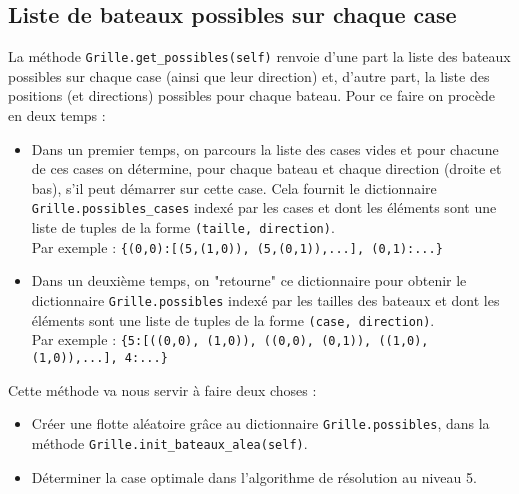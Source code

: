 \subsection{Liste de bateaux possibles sur chaque case}
La méthode \texttt{Grille.get\_possibles(self)} renvoie d'une part la liste des bateaux possibles sur chaque case (ainsi que leur direction) et, d'autre part, la liste des positions (et directions) possibles pour chaque bateau. Pour ce faire on procède en deux temps :
\begin{itemize}
\item Dans un premier temps, on parcours la liste des cases vides et pour chacune de ces cases on détermine, pour chaque bateau et chaque direction (droite et bas), s'il peut démarrer sur cette case. Cela fournit le dictionnaire \texttt{Grille.possibles\_cases} indexé par les cases et dont les éléments sont une liste de tuples de la forme \texttt{(taille, direction)}.\\
Par exemple : \texttt{\{(0,0):[(5,(1,0)), (5,(0,1)),...], (0,1):...\}}
\item Dans un deuxième temps, on "retourne" ce dictionnaire pour obtenir le dictionnaire \texttt{Grille.possibles} indexé par les tailles des bateaux et dont les éléments sont une liste de tuples de la forme \texttt{(case, direction)}.\\
Par exemple : \texttt{\{5:[((0,0), (1,0)), ((0,0), (0,1)), ((1,0), (1,0)),...], 4:...\}}
\end{itemize}

\medskip

Cette méthode va nous servir à faire deux choses :
\begin{itemize}
\item Créer une flotte aléatoire grâce au dictionnaire \texttt{Grille.possibles}, dans la méthode \texttt{Grille.init\_bateaux\_alea(self)}.
\item Déterminer la case optimale dans l'algorithme de résolution au niveau 5.
\end{itemize}

